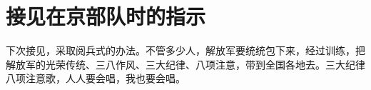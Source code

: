 \section[接见在京部队时的指示（一九六六年十月十三日）]{接见在京部队时的指示}


下次接见，采取阅兵式的办法。不管多少人，解放军要统统包下来，经过训练，把解放军的光荣传统、三八作风、三大纪律、八项注意，带到全国各地去。三大纪律八项注意歌，人人要会唱，我也要会唱。


